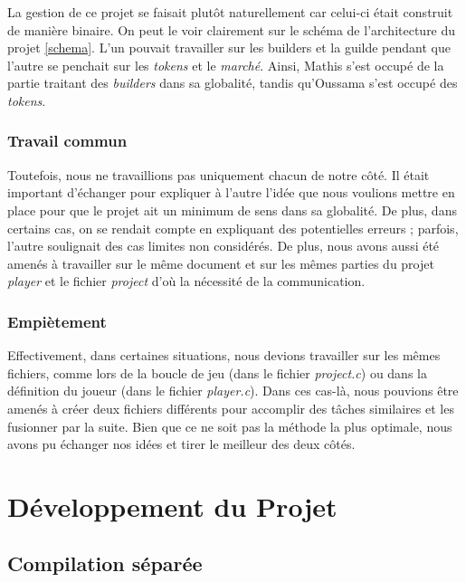\documentclass{article}
\begin{document}
\hspace{1em}La gestion de ce projet se faisait plutôt naturellement car celui-ci était construit de manière binaire. On peut le voir clairement sur le schéma de l'architecture du projet \ref{schema}. L'un pouvait travailler sur les builders et la guilde pendant que l'autre se penchait sur les \emph{tokens} et le \emph{marché}. Ainsi, Mathis s'est occupé de la partie traitant des \emph{builders} dans sa globalité, tandis qu'Oussama s'est occupé des \emph{tokens}.
\subsubsection{Travail commun}

\hspace{1em} Toutefois, nous ne travaillions pas uniquement chacun de notre côté. Il était important d'échanger pour expliquer à l'autre l'idée que nous voulions mettre en place pour que le projet ait un minimum de sens dans sa globalité. De plus, dans certains cas, on se rendait compte en expliquant des potentielles erreurs ; parfois, l'autre soulignait des cas limites non considérés. De plus, nous avons aussi été amenés à travailler sur le même document et sur les mêmes parties du projet \emph{player} et le fichier \emph{project} d'où la nécessité de la communication. 


\subsubsection{Empiètement}

\hspace{1em} Effectivement, dans certaines situations, nous devions travailler sur les mêmes fichiers, comme lors de la boucle de jeu (dans le fichier \emph{project.c}) ou dans la définition du joueur (dans le fichier \emph{player.c}). Dans ces cas-là, nous pouvions être amenés à créer deux fichiers différents pour accomplir des tâches similaires et les fusionner par la suite. Bien que ce ne soit pas la méthode la plus optimale, nous avons pu échanger nos idées et tirer le meilleur des deux côtés. 

\section{Développement du Projet}
\vspace{1em}
\subsection{Compilation séparée}
\end{document}

